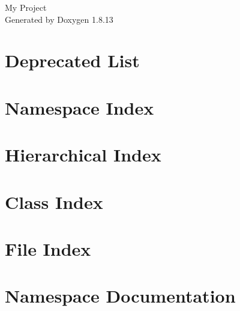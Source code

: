 \documentclass[twoside]{book}
\newcommand{\+}{\discretionary{\mbox{\scriptsize$\hookleftarrow$}}{}{}}
\newcommand{\clearemptydoublepage}{%
  \newpage{\pagestyle{empty}\cleardoublepage}%
}
\begin{document}
\hypersetup{pageanchor=false,
             bookmarksnumbered=true,
             pdfencoding=unicode
            }
\begin{titlepage}
\vspace*{7cm}
\begin{center}%
{\Large My Project }\\
\vspace*{1cm}
{\large Generated by Doxygen 1.8.13}\\
\end{center}
\end{titlepage}
\clearemptydoublepage
{}
\tableofcontents
\clearemptydoublepage
{}
\hypersetup{pageanchor=true}

\chapter{Deprecated List}
\label{deprecated}

\chapter{Namespace Index}

\chapter{Hierarchical Index}

\chapter{Class Index}

\chapter{File Index}

\chapter{Namespace Documentation}














\end{document}

